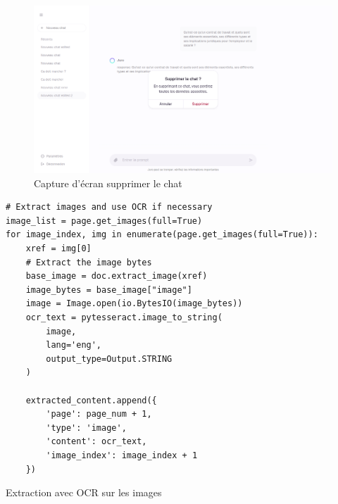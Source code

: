 \begin{figure}[H]
    \centering
    \includegraphics[width=15cm]{Images/screenshot-juro-6.png}
    \caption{Capture d'écran supprimer le chat}
    \label{fig:app-screenshot-1}
\end{figure}

\begin{listing}[!ht]
\begin{verbatim}
# Extract images and use OCR if necessary
image_list = page.get_images(full=True)
for image_index, img in enumerate(page.get_images(full=True)):
    xref = img[0]
    # Extract the image bytes
    base_image = doc.extract_image(xref)
    image_bytes = base_image["image"]
    image = Image.open(io.BytesIO(image_bytes))
    ocr_text = pytesseract.image_to_string(
        image, 
        lang='eng',
        output_type=Output.STRING
    )
    
    extracted_content.append({
        'page': page_num + 1, 
        'type': 'image', 
        'content': ocr_text, 
        'image_index': image_index + 1
    })
\end{verbatim}
\caption{Extraction avec OCR sur les images}
\label{appendix:code:python:text-extract-images}
\end{listing}

